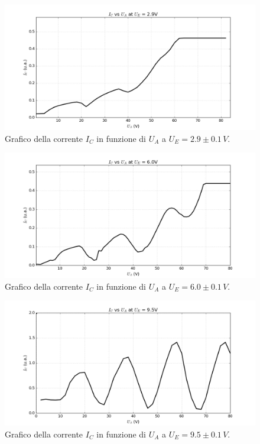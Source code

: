 \documentclass[10pt,a4paper]{article}
\begin{document}
\begin{table}[!htb]
\begin{table}[!htb]
\begin{figure}[!htb]
  \centering
  \includegraphics[scale=.5]{plot29.png}
\caption{Grafico della corrente $I_C$ in funzione di $U_A$ a $U_E = 2.9\pm0.1 \, V$.}
\label{grafico4}
\end{figure}

\begin{figure}[!htb]
  \centering
  \includegraphics[scale=.5]{plot60.png}
\caption{Grafico della corrente $I_C$ in funzione di $U_A$ a $U_E = 6.0 \pm 0.1\, V$.}
\label{grafico5}
\end{figure}

\begin{figure}[!htb]
  \centering
  \includegraphics[scale=.5]{plot95.png}
\caption{Grafico della corrente $I_C$ in funzione di $U_A$ a $U_E = 9.5 \pm 0.1\, V$.}
\label{grafico6}
\end{figure}




\end{table}
\end{table}
\end{document}
